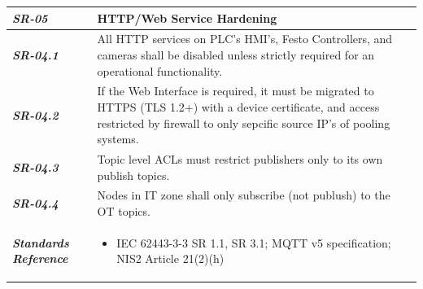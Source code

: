 \documentclass{article}
\begin{document}
\begin{tabularx}{\textwidth}{>{\bfseries}p{2.5cm} X}
    \textit{SR-05} & \textbf{HTTP/Web Service Hardening} \vspace{0.5em}\\
\toprule
\textit{SR-04.1} &

    All HTTP services on PLC's HMI's, Festo Controllers, and cameras shall be disabled unless strictly required for an operational functionality.
    \vspace{0.5em}
\\
\textit{SR-04.2} &
    If the Web Interface is required, it must be migrated to HTTPS (TLS 1.2+) with a device certificate, and access restricted by firewall to only sepcific source
    IP's of pooling systems.
    \vspace{0.5em}
    \\
\textit{SR-04.3} &
    Topic level ACLs must restrict publishers only to its own publish topics.
    \vspace{0.5em}
    \\
\textit{SR-04.4} &
    Nodes in IT zone shall only subscribe (not publush) to the OT topics.
    \vspace{0.5em}
    \\
\midrule
    \textit{Standards Reference} &
\begin{itemize}[label=-, noitemsep, topsep=0pt, leftmargin=*]
    \item IEC 62443-3-3 SR 1.1, SR 3.1; MQTT v5 specification; NIS2 Article 21(2)(h)
\end{itemize} \vspace{1em} \\ 
\end{tabularx}
\vspace{2em}
\end{document}
